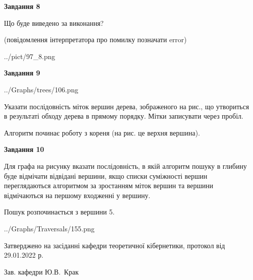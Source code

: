 \documentclass[12pt, ukrainian]{article}
\begin{document}
{\begin {large}
{\begin {center}\textbf{Завдання 8}\end {center}}\par
Що буде виведено за виконання?\par
 (повідомлення інтерпретатора про помилку позначати error)\par
\begin{center}
	{../pict/97_8.png}
\end{center}
\newpage

{\begin {center}\textbf{Завдання 9}\end {center}}\par

\begin{center}
	{../Graphs/trees/106.png}
\end{center}
Указати послідовність міток вершин дерева, зображеного на рис., що утвориться в результаті обходу дерева в прямому порядку. Мітки записувати через пробіл.\par Алгоритм починає роботу з кореня (на рис. це верхня вершина).\par
\newpage

{\begin {center}\textbf{Завдання 10}\end {center}}\par
Для графа на рисунку вказати послідовність, в якій алгоритм пошуку в глибину буде відмічати відвідані вершини, якщо списки суміжності вершин переглядаються алгоритмом за зростанням міток вершин та вершини відмічаються на першому вход\-женні у вершину.\par
Пошук розпочинається з вершини 5.\par

\begin{center}
	{../Graphs/Traversals/155.png}
\end{center}\par
\newpage


\end {large}
}
{\smallskip \begin {small} Затверджено на засіданні кафедри теоретичної кібернетики, протокол  від   29.01.2022 р.\par\smallskip\smallskip
{\parbox {6.5 cm}{Зав. кафедри \dotfill Ю.В.~Крак}} \end{small}}
\end{document}
